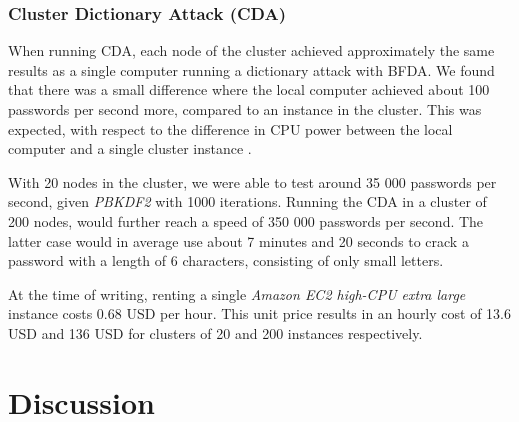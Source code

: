 \documentclass[pdftex,english,10pt,b5paper,twoside]{book}
\begin{document}
\subsection{Cluster Dictionary Attack (CDA)}

When running \ac{CDA}, each node of the cluster achieved approximately the same
results as a single computer running a dictionary attack with \ac{BFDA}. We
found that there was a small difference where the local computer achieved about
100 passwords per second more, compared to an instance in the cluster. This was
expected, with respect to the difference in \ac{CPU} power between the local
computer and a single cluster instance \cite{cpubench}. 

With 20 nodes in the cluster, we were able to test around 35 000 passwords per
second, given \emph{PBKDF2} with 1000 iterations. Running the \ac{CDA} in a
cluster of 200 nodes, would further reach a speed of 350 000 passwords per
second. The latter case would in average use about 7 minutes and 20 seconds to
crack a password with a length of 6 characters, consisting of only small
letters.

At the time of writing, renting a single \emph{Amazon EC2 high-CPU extra large}
instance costs 0.68 USD per hour. This unit price results in an hourly cost of
13.6 USD and 136 USD for clusters of 20 and 200 instances respectively. 

\chapter{Discussion}
\label{ch:discussion}



\end{document}
